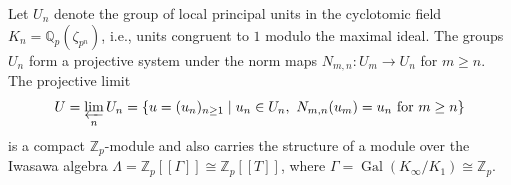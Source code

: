 Let $U_n$ denote the group of local principal units in the cyclotomic field $K_n = \mathbb{Q}_p(\zeta_{p^n})$, i.e., units congruent to $1$ modulo the maximal ideal. The groups $U_n$ form a projective system under the norm maps $N_{m,n}: U_m \to U_n$ for $m \ge n$. The projective limit
$$U = \varprojlim_{n} U_n = \left\{ u = (u_n)_{n \ge 1} \mid u_n \in U_n,\ N_{m,n}(u_m) = u_n \text{ for } m \ge n \right\}$$
is a compact $\mathbb{Z}_p$-module and also carries the structure of a module over the Iwasawa algebra $\Lambda = \mathbb{Z}_p[[\Gamma]] \cong \mathbb{Z}_p[[T]]$, where $\Gamma = \operatorname{Gal}(K_\infty/K_1) \cong \mathbb{Z}_p$.
